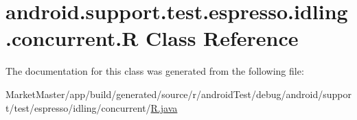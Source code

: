\hypertarget{classandroid_1_1support_1_1test_1_1espresso_1_1idling_1_1concurrent_1_1R}{}\section{android.\+support.\+test.\+espresso.\+idling.\+concurrent.\+R Class Reference}
\label{classandroid_1_1support_1_1test_1_1espresso_1_1idling_1_1concurrent_1_1R}


The documentation for this class was generated from the following file\+:\begin{DoxyCompactItemize}
\item 
Market\+Master/app/build/generated/source/r/android\+Test/debug/android/support/test/espresso/idling/concurrent/\mbox{\hyperlink{androidTest_2debug_2android_2support_2test_2espresso_2idling_2concurrent_2R_8java}{R.\+java}}\end{DoxyCompactItemize}
